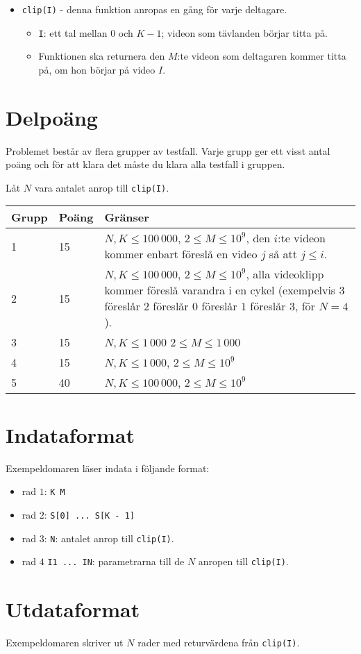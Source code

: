 \begin{itemize}
  \item \texttt{clip(I)} - denna funktion anropas en gång för varje deltagare.
  \begin{itemize}
    \item \texttt{I}: ett tal mellan $0$ och $K - 1$; videon som tävlanden börjar titta på.
		\item Funktionen ska returnera den $M$:te videon som deltagaren kommer titta på, om hon börjar på video $I$.
  \end{itemize}
\end{itemize}

\section*{Delpoäng}
Problemet består av flera grupper av testfall. Varje grupp ger ett visst antal poäng och för att klara det måste du klara alla testfall i gruppen.

Låt $N$ vara antalet anrop till \texttt{clip(I)}.

\begin{tabular}{|l|l|p{7cm}|}
  \hline
  \textbf{Grupp} & \textbf{Poäng} & \textbf{Gränser} \\ \hline
  1 & 15 & $N, K \le 100\,000$, $2 \le M \le 10^9$, den $i$:te videon kommer enbart föreslå en video $j$ så att $j \le i$. \\ \hline
  2 & 15 & $N, K \le 100\,000$, $2 \le M \le 10^9$, alla videoklipp kommer föreslå varandra i en cykel (exempelvis $3$ föreslår $2$ föreslår $0$ föreslår $1$ föreslår $3$, för $N = 4$). \\ \hline
  3 & 15 & $N, K \le 1\,000$ $2 \le M \le 1\,000$ \\ \hline
  4 & 15 & $N, K \le 1\,000$, $2 \le M \le 10^9$ \\ \hline
  5 & 40 & $N, K \le 100\,000$, $2 \le M \le 10^9$ \\ \hline
\end{tabular}

\section*{Indataformat}
Exempeldomaren läser indata i följande format:

\begin{itemize}
  \item rad $1$: \texttt{K M}
  \item rad $2$: \texttt{S[0] ... S[K - 1]}
  \item rad $3$: \texttt{N}: antalet anrop till \texttt{clip(I)}.
  \item rad $4$ \texttt{I1 ... IN}: parametrarna till de $N$ anropen till \texttt{clip(I)}.
\end{itemize}

\section*{Utdataformat}
Exempeldomaren skriver ut $N$ rader med returvärdena från \texttt{clip(I)}.

